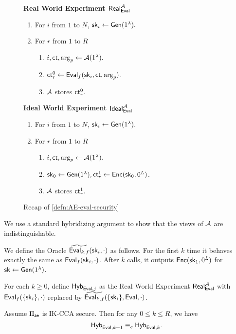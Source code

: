 \begin{figure}[ht!]
\begin{framed}
\textbf{Real World Experiment $\mathsf{Real}^{\mathcal{A}}_{\mathsf{Eval}}$}
\begin{enumerate}
    \item For $i$ from $1$ to $N$, ${\mathsf{sk}}_i \leftarrow \mathsf{Gen}(1^{\lambda}).$
    \item For $r$ from $1$ to $R$
    \begin{enumerate}
        \item $i, \mathsf{ct}, \arg_p \leftarrow \mathcal{A}(1^{\lambda}).$
        \item $\mathsf{ct}^{0}_r \leftarrow \mathsf{Eval}_f({\mathsf{sk}}_i, \mathsf{ct}, \arg_p)$.
        \item $\mathcal{A}$ stores $\mathsf{ct}^{0}_r$.
    \end{enumerate}
\end{enumerate}
\textbf{Ideal World Experiment $\mathsf{Ideal}^{\mathcal{A}}_{\mathsf{Eval}}$}
\begin{enumerate}
    \item For $i$ from $1$ to $N$, ${\mathsf{sk}}_i \leftarrow \mathsf{Gen}(1^{\lambda}).$
    \item For $r$ from $1$ to $R$
    \begin{enumerate}
        \item $i, \mathsf{ct}, \arg_p \leftarrow \mathcal{A}(1^{\lambda}).$
        \item ${\mathsf{sk}}_0 \leftarrow \mathsf{Gen}(1^{\lambda}), \mathsf{ct}^{1}_r \leftarrow \mathsf{Enc}({\mathsf{sk}}_0, 0^L)$.
        \item $\mathcal{A}$ stores $\mathsf{ct}^{1}_r$.
    \end{enumerate}
\end{enumerate}
\end{framed}
\caption{Recap of \cref{defn:AE-eval-security}}
\end{figure}
We use a standard hybridizing argument to show that the views of $\mathcal{A}$ are indistinguishable. 
\begin{definition}
We define the Oracle $\widetilde{\mathsf{Eval}_{k, f}}({\mathsf{sk}}_i, \cdot)$ as follows. For the first $k$ time it behaves exactly the same as $\mathsf{Eval}_f({\mathsf{sk}}_i, \cdot)$. After $k$ calls, it outputs $\mathsf{Enc}({\mathsf{sk}}_1, 0^L)$ for ${\mathsf{sk}} \leftarrow \mathsf{Gen}(1^{\lambda})$.

For each $k \geq 0$, define $\mathsf{Hyb}_{\mathsf{Eval}, j}$ as the Real World Experiment $\mathsf{Real}_{\mathsf{Eval}}^{\mathcal{A}}$ with $\mathsf{Eval}_f(\{{\mathsf{sk}}_i\}, \cdot)$ replaced by $\widetilde{\mathsf{Eval}_{k, f}}(\{{\mathsf{sk}}_i\}, \mathsf{Eval}, \cdot)$. 
\end{definition}
\begin{lemma}
     Assume $\Pi_{\mathsf{ae}}$ is IK-CCA secure. Then for any $0 \leq k \leq R$, we have 
    $$\mathsf{Hyb}_{\mathsf{Eval}, k + 1} \equiv_c \mathsf{Hyb}_{\mathsf{Eval}, k}.$$
\end{lemma}
